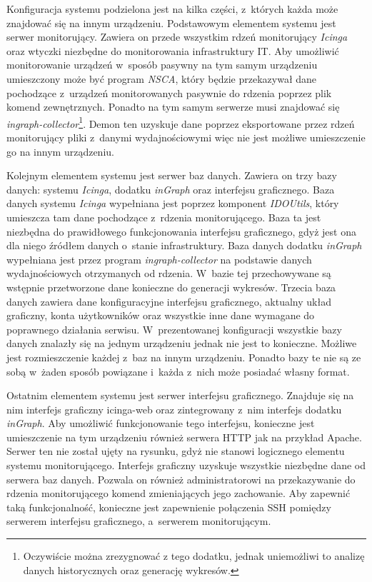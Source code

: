 Konfiguracja systemu podzielona jest na kilka części, z~których każda
może znajdować się na innym urządzeniu. Podstawowym elementem systemu
jest serwer monitorujący. Zawiera on przede wszystkim rdzeń
monitorujący {\em Icinga} oraz wtyczki niezbędne do monitorowania
infrastruktury IT. Aby umożliwić monitorowanie urządzeń w~sposób
pasywny na tym samym urządzeniu umieszczony może być program {\em NSCA},
który będzie przekazywał dane pochodzące z~urządzeń monitorowanych
pasywnie do rdzenia poprzez plik komend zewnętrznych. Ponadto na tym
samym serwerze musi znajdować się
{\em ingraph-collector}\footnote{Oczywiście można zrezygnować z tego
  dodatku, jednak uniemożliwi to analizę danych historycznych oraz
  generację wykresów.}. Demon ten uzyskuje dane poprzez eksportowane
przez rdzeń monitorujący pliki z~danymi wydajnościowymi więc nie jest
możliwe umieszczenie go na innym urządzeniu.

Kolejnym elementem systemu jest serwer baz danych. Zawiera on trzy
bazy danych: systemu {\em Icinga}, dodatku {\em inGraph} oraz interfejsu
graficznego. Baza danych systemu {\em Icinga} wypełniana jest poprzez
komponent {\em IDOUtils}, który umieszcza tam dane pochodzące z~rdzenia
monitorującego. Baza ta jest niezbędna do prawidłowego funkcjonowania
interfejsu graficznego, gdyż jest ona dla niego źródłem danych
o~stanie infrastruktury. Baza danych dodatku {\em inGraph} wypełniana jest
przez program {\em ingraph-collector} na podstawie danych wydajnościowych
otrzymanych od rdzenia. W~bazie tej przechowywane są wstępnie
przetworzone dane konieczne do generacji wykresów. Trzecia baza danych
zawiera dane konfiguracyjne interfejsu graficznego, aktualny układ
graficzny, konta użytkowników oraz wszystkie inne dane wymagane do
poprawnego działania serwisu. W~prezentowanej konfiguracji wszystkie
bazy danych znalazły się na jednym urządzeniu jednak nie jest to
konieczne. Możliwe jest rozmieszczenie każdej z~baz na innym
urządzeniu. Ponadto bazy te nie są ze sobą w~żaden sposób powiązane
i~każda z~nich może posiadać własny format.

Ostatnim elementem systemu jest serwer interfejsu
graficznego. Znajduje się na nim interfejs graficzny icinga-web oraz
zintegrowany z~nim interfejs dodatku {\em inGraph}. Aby umożliwić
funkcjonowanie tego interfejsu, konieczne jest umieszczenie na tym
urządzeniu również serwera HTTP jak na przykład Apache. Serwer ten nie
został ujęty na rysunku, gdyż nie stanowi logicznego elementu systemu
monitorującego. Interfejs graficzny uzyskuje wszystkie niezbędne dane
od serwera baz danych. Pozwala on również administratorowi na
przekazywanie do rdzenia monitorującego komend zmieniających jego
zachowanie. Aby zapewnić taką funkcjonalność, konieczne jest
zapewnienie połączenia SSH pomiędzy serwerem interfejsu graficznego,
a~serwerem monitorującym.

